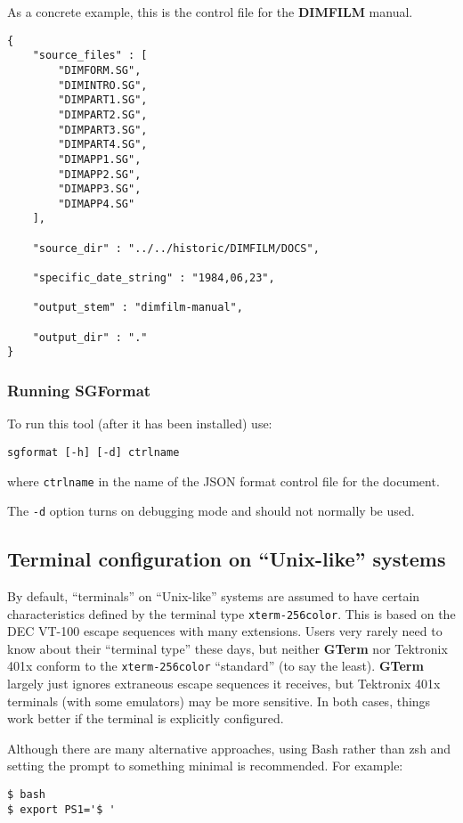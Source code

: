 \documentclass[a4paper,twoside,11pt]{article}
\newcommand{\newpara}{\par\vspace{4mm}\noindent}
\begin{document}
\newpara
As a concrete example, this is the control file for the \textbf{DIMFILM} manual.
\begin{lstlisting}
{
    "source_files" : [
        "DIMFORM.SG",
        "DIMINTRO.SG",
        "DIMPART1.SG",
        "DIMPART2.SG",
        "DIMPART3.SG",
        "DIMPART4.SG",
        "DIMAPP1.SG",
        "DIMAPP2.SG",
        "DIMAPP3.SG",
        "DIMAPP4.SG"
    ],

    "source_dir" : "../../historic/DIMFILM/DOCS",

    "specific_date_string" : "1984,06,23",

    "output_stem" : "dimfilm-manual",

    "output_dir" : "."
}
\end{lstlisting}

\subsubsection{Running SGFormat}
To run this tool (after it has been installed) use:
\begin{lstlisting}
sgformat [-h] [-d] ctrlname
\end{lstlisting}
where \texttt{ctrlname} in the name of the JSON format control file for the document.

\newpara
The \texttt{-d} option turns on debugging mode and should not normally be used.

\subsection{Terminal configuration on ``Unix-like'' systems}
\newpara
By default, ``terminals'' on ``Unix-like'' systems are assumed to have certain characteristics defined by
the terminal type \texttt{xterm-256color}. This is based on the DEC VT-100 escape sequences with many extensions.
Users very rarely need to know about their ``terminal type'' these days, but neither \textbf{GTerm} nor Tektronix 401x
conform to the \texttt{xterm-256color} ``standard'' (to say the least). \textbf{GTerm} largely just ignores extraneous
escape sequences it receives, but Tektronix 401x terminals (with some emulators) may be more sensitive. In both cases,
things work better if the terminal is explicitly configured.

\newpara
Although there are many alternative approaches, using Bash rather than zsh and setting the prompt to something
minimal is recommended. For example:
\begin{lstlisting}
$ bash
$ export PS1='$ '
\end{lstlisting}
\end{document}
